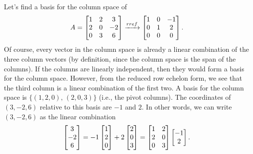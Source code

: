 \begin{example}\label{colspace1ex}
Let's find a basis for the column space of
$$A=\begin{bmatrix}
\begin{matrix} 1\\2\\0 \end{matrix}
&\begin{matrix} 2\\0\\3 \end{matrix}
&\begin{matrix} 3\\-2\\6 \end{matrix}
\end{bmatrix}
\xrightarrow{rref}
\begin{bmatrix}
\begin{matrix} 1\\0\\0 \end{matrix}
&\begin{matrix} 0\\1\\0 \end{matrix}
&\begin{matrix} -1\\2\\0 \end{matrix}
\end{bmatrix}.
$$
Of course, every vector in the column space is already a linear combination of the three column vectors (by definition, since the column space is the span of the columns).  If the columns are linearly independent, then they would form a basis for the column space.  However, from the reduced row echelon form, we see that the third column is a linear combination of the first two. A basis for the column space is $\{(1,2,0),\,(2,0,3)\}$ (i.e., the pivot columns). 
The coordinates of $(3,-2,6)$ relative to this basis are $-1$ and $2$.  In other words, we can write $(3,-2,6)$ as the linear combination 
 $$\begin{bmatrix}3\\-2\\6\end{bmatrix}
=-1\begin{bmatrix}1\\2\\0\end{bmatrix}+2\begin{bmatrix}2\\0\\3\end{bmatrix} 
=\begin{bmatrix}\begin{matrix} 1\\2\\0 \end{matrix}&\begin{matrix} 2\\0\\3 \end{matrix}\end{bmatrix}\begin{bmatrix}-1\\2\end{bmatrix} .$$ 
\marginpar{
}
\end{example}

